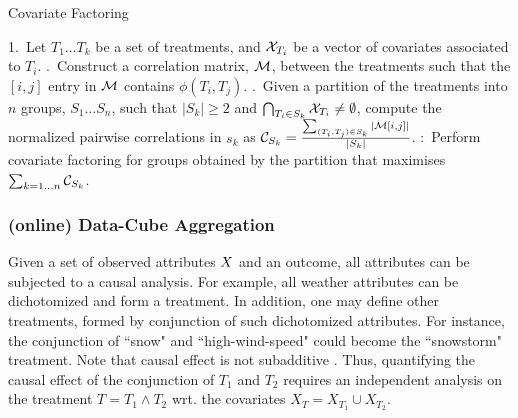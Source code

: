 \vspace{-0.2cm}\begin{algorithm}

\caption{Covariate Factoring}
\label{al:cf1} 

1.\  Let $T_1 \ldots T_k$ be a set of treatments, and  ${{\mathcal{X}}}_{T_i}$ be a vector of covariates associated to $T_i$.   .\ Construct a correlation matrix, $\mathcal{M}$, between the treatments such that
the $[i,j]$ entry in $\mathcal{M}$ contains $\phi(T_i,T_j)$.   .\ Given a partition of the treatments into $n$ groups, $S_1 \ldots S_n$, such that $|S_k|\geq 2$ and
  $\bigcap_{T_i \in S_k} {{\mathcal{X}}}_{T_i} \not = \emptyset$, compute the normalized pairwise correlations in $s_k$
  as $\mathcal{C}_{S_k}= \frac{\sum_{(T_i,T_j) \in S_k} |\mathcal{M}[i,j]|}{|S_k|}$. :\ Perform covariate factoring for groups obtained by the partition that maximises $\sum_{k=1\dots n} \mathcal{C}_{S_k}$.

\end{algorithm}




\subsubsection{(online)  Data-Cube Aggregation}
\label{sec:cube}

Given a set of observed attributes ${{X}}$ and an outcome, all attributes can be subjected to a causal
analysis. For example, all weather attributes can be dichotomized and form
a treatment. In addition, one may define other treatments, formed by conjunction of such dichotomized attributes. For instance, the conjunction of ``snow" and ``high-wind-speed" could become the ``snowstorm" treatment. Note that
causal effect is not subadditive \cite{janzing2013quantifying}. Thus, quantifying the causal effect of the conjunction of $T_1$ and $T_2$
requires an independent analysis on the treatment $T=T_1 \land T_2$ wrt. the covariates  $X_{T}= X_{T_1} \cup X_{T_2}$.

